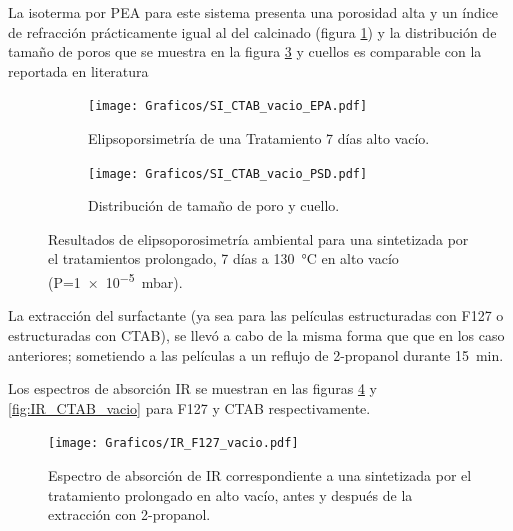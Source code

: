 {		La isoterma por PEA para este sistema presenta una porosidad alta y un índice de refracción prácticamente igual al del calcinado (figura \ref{fig:CTAB_vacio_EPA}) y la distribución de tamaño de poros que se muestra en la figura \ref{fig:CTAB_vacio_PSD} y cuellos es comparable con la reportada en literatura \cite{Boissiere2005}

		\pagebreak		     
				     
 		\begin{figure}[!ht]
		  	\begin{subfigure}[t]{0.495\textwidth}
		  	\texttt{[image: Graficos/SI\_CTAB\_vacio\_EPA.pdf]}
			\caption{Elipsoporsimetría de una \pdmC\space Tratamiento 7 días alto vacío.}
			\label{fig:CTAB_vacio_EPA}
			\end{subfigure}
			\begin{subfigure}[t]{0.495\textwidth}
		  	\texttt{[image: Graficos/SI\_CTAB\_vacio\_PSD.pdf]}
			\caption{Distribución de tamaño de poro y cuello.\\ }
			\label{fig:CTAB_vacio_PSD}
			\end{subfigure}
			\caption[Elipsoporosimetría \pdmC\space tratamiento alto vacío.]{Resultados de elipsoporosimetría ambiental para una \pdmC\space sintetizada por el tratamientos prolongado, 7 días a \SI{130}{\celsius} en alto vacío (P=\SI{1e-5}{\milli\bar}).}
			\end{figure} 	
		
		La extracción del surfactante (ya sea para las películas estructuradas con F127 o estructuradas con CTAB), se llevó a cabo de la misma forma que que en los caso anteriores; sometiendo a las películas a un reflujo de 2-propanol durante \SI{15}{\minute}. 

		Los espectros de absorción IR se muestran en las figuras \ref{fig:IR_F127_vacio} y \ref{fig:IR_CTAB_vacio} para F127 y CTAB respectivamente.		

		\begin{figure}[!ht]
			 	\begin{center}
			 	\texttt{[image: Graficos/IR\_F127\_vacio.pdf]}
			 	\caption[FTIR \pdmF\space tratamiento prolongado.]{Espectro de absorción de IR correspondiente a una \pdmF\space sintetizada por el tratamiento prolongado en alto vacío, antes y después de la extracción con 2-propanol.}
			 	\label{fig:IR_F127_vacio}
			 	\end{center}
			 	\end{figure}
			
		\pagebreak
					
}
